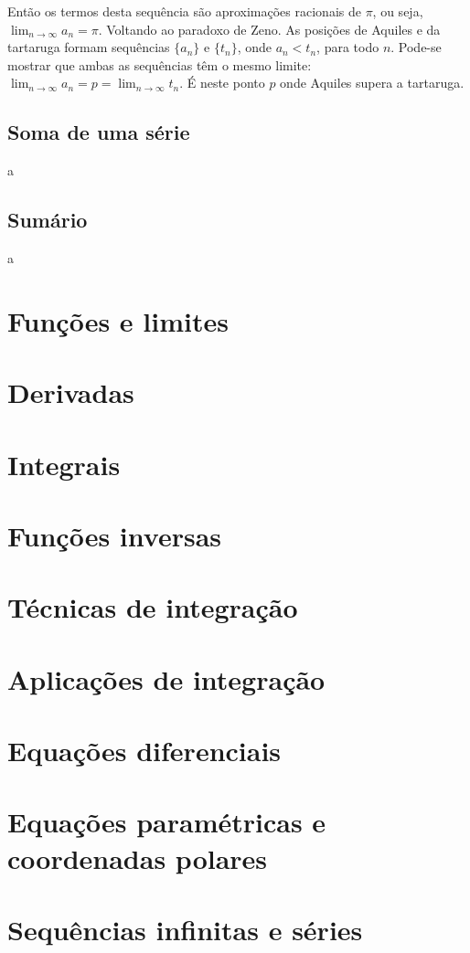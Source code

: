 \noindent Então os termos desta sequência são aproximações racionais de $\pi$, ou seja, $\lim_{n\rightarrow \infty}a_n=\pi$. Voltando ao paradoxo de Zeno. As posições de Aquiles e da tartaruga formam sequências $\{a_n\}$ e $\{t_n\}$, onde $a_n<t_n$, para todo $n$. Pode-se mostrar que ambas as sequências têm o mesmo limite: $\lim_{n\rightarrow\infty}a_n=p=\lim_{n\rightarrow\infty}t_n$. É neste ponto $p$ onde Aquiles supera a tartaruga.

\subsection{Soma de uma série}
a
\subsection{Sumário}
a

\section{Funções e limites}
\section{Derivadas}
\section{Integrais}
\section{Funções inversas}
\section{Técnicas de integração}
\section{Aplicações de integração}
\section{Equações diferenciais}
\section{Equações paramétricas e coordenadas polares}
\section{Sequências infinitas e séries}
